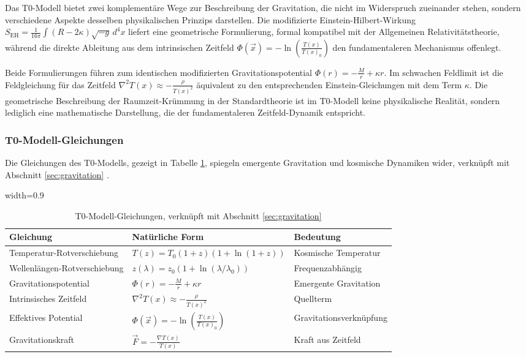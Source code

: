 \documentclass[12pt,a4paper]{article}
\newcommand{\Tfield}{T(x)}
\newcommand{\tablescale}{0.9}
\begin{document}
	Das T0-Modell bietet zwei komplementäre Wege zur Beschreibung der Gravitation, die nicht im Widerspruch zueinander stehen, sondern verschiedene Aspekte desselben physikalischen Prinzips darstellen. Die modifizierte Einstein-Hilbert-Wirkung $S_{\mathrm{EH}} = \frac{1}{16\pi} \int (R - 2\kappa) \sqrt{-g} \, d^4x$ liefert eine geometrische Formulierung, formal kompatibel mit der Allgemeinen Relativitätstheorie, während die direkte Ableitung aus dem intrinsischen Zeitfeld $\Phi(\vec{x}) = -\ln\left(\frac{\Tfield}{\Tfield_0}\right)$ den fundamentaleren Mechanismus offenlegt.
	
	Beide Formulierungen führen zum identischen modifizierten Gravitationspotential $\Phi(r) = -\frac{M}{r} + \kappa r$. Im schwachen Feldlimit ist die Feldgleichung für das Zeitfeld $\nabla^2\Tfield \approx -\frac{\rho}{\Tfield^2}$ äquivalent zu den entsprechenden Einstein-Gleichungen mit dem Term $\kappa$. Die geometrische Beschreibung der Raumzeit-Krümmung in der Standardtheorie ist im T0-Modell keine physikalische Realität, sondern lediglich eine mathematische Darstellung, die der fundamentaleren Zeitfeld-Dynamik entspricht.
	\subsubsection{T0-Modell-Gleichungen}
	\label{subsec:t0_equations}
	
	Die Gleichungen des T0-Modells, gezeigt in Tabelle \ref{tab:t0_equations}, spiegeln emergente Gravitation und kosmische Dynamiken wider, verknüpft mit Abschnitt \ref{sec:gravitation} \cite{pascher_emergente_2025}.
	
\begin{table}[htbp]
	\centering
	\begin{adjustbox}{width=\tablescale\textwidth}
		\begin{tabular}{lll}
			\toprule
			\textbf{Gleichung} & \textbf{Natürliche Form} & \textbf{Bedeutung} \\
			\midrule
			Temperatur-Rotverschiebung & \(T(z) = T_0 (1+z)(1+\ln(1+z))\) & Kosmische Temperatur \\
			Wellenlängen-Rotverschiebung & \(z(\lambda) = z_0 (1+\ln(\lambda/\lambda_0))\) & Frequenzabhängig \\
			Gravitationspotential & \(\Phi(r) = -\frac{M}{r} + \kappa r\) & Emergente Gravitation \\
			Intrinsisches Zeitfeld & \(\nabla^2 \Tfield \approx -\frac{\rho}{\Tfield^2}\) & Quellterm \\
			Effektives Potential & \(\Phi(\vec{x}) = -\ln\left(\frac{\Tfield}{\Tfield_0}\right)\) & Gravitationsverknüpfung \\
			Gravitationskraft & \(\vec{F} = -\frac{\nabla \Tfield}{\Tfield}\) & Kraft aus Zeitfeld \\
			\bottomrule
		\end{tabular}
	\end{adjustbox}
	\caption{T0-Modell-Gleichungen, verknüpft mit Abschnitt \ref{sec:gravitation}}
	\label{tab:t0_equations}
\end{table}
	
\end{document}
